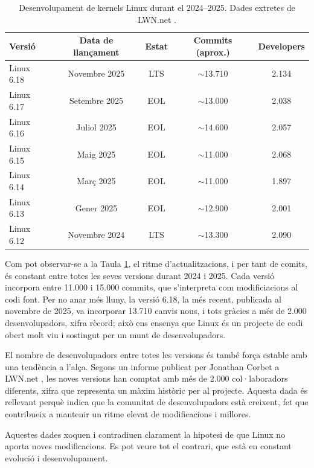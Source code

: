 \documentclass{article}
\begin{document}
\begin{table}[ht]
    \centering
    \begin{tabular}{lcccc}
        \toprule
        \textbf{Versió} & \textbf{Data de llançament} & \textbf{Estat} & \textbf{Commits (aprox.)} & \textbf{Developers} \\
        \midrule
        Linux 6.18 & Novembre 2025 & LTS & $\sim$13.710 & 2.134 \\
        Linux 6.17 & Setembre 2025 & EOL & $\sim$13.000 & 2.038 \\
        Linux 6.16 & Juliol 2025 & EOL & $\sim$14.600 & 2.057 \\
        Linux 6.15 & Maig 2025 & EOL & $\sim$11.000 & 2.068 \\
        Linux 6.14 & Març 2025 & EOL & $\sim$11.000 & 1.897\\
        Linux 6.13 & Gener 2025 & EOL & $\sim$12.900 & 2.001\\
        Linux 6.12 & Novembre 2024 & LTS & $\sim$13.300 & 2.090 \\
        \bottomrule
    \end{tabular}
    \caption{Desenvolupament de kernels Linux durant el 2024--2025. Dades extretes de LWN.net \cite{lwn_618_stats}.}
    \label{tab:kernel_stats}
\end{table}

Com pot observar-se a la Taula \ref{tab:kernel_stats}, el ritme d'actualitzacions, i per tant de comits, és constant entre totes les seves versions durant 2024 i 2025. Cada versió incorpora entre 11.000 i 15.000 commits, que s'interpreta com modificiacions al codi font. Per no anar més lluny, la versió 6.18, la més recent, publicada al novembre de 2025, va incorporar 13.710 canvis nous, i tots gràcies a més de 2.000 desenvolupadors, xifra rècord; això ens ensenya que Linux és un projecte de codi obert molt viu i sostingut per un munt de desenvolupadors.

El nombre de desenvolupadors entre totes les versions és també força estable amb una tendència a l'alça. Segons un informe publicat per Jonathan Corbet a LWN.net \cite{lwn_stats}, les noves versions han comptat amb més de 2.000 col·laboradors diferents, xifra que representa un màxim històric per al projecte. Aquesta dada és rellevant perquè indica que la comunitat de desenvolupadors està creixent, fet que contribueix a mantenir un ritme elevat de modificacions i millores.

Aquestes dades xoquen i contradiuen clarament la hipotesi de que Linux no aporta noves modificacions. Es pot veure tot el contrari, que està en constant evolució i desenvolupament.
\end{document}

